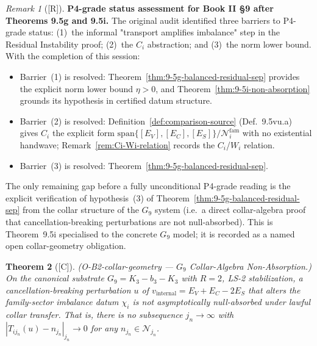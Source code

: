 \documentclass[12pt,oneside]{amsbook}
\theoremstyle{plain}
\newtheorem{theorem}{Theorem}[section]
\theoremstyle{definition}
\theoremstyle{remark}
\newtheorem{remark}[theorem]{Remark}
\newcommand{\status}[1]{\textup{[#1]}}
\begin{document}
\begin{remark}[\status{R}]\label{rem:P4-grade-status}
\textbf{P4-grade status assessment for Book II §9 after Theorems
9.5g and 9.5i.}
The original audit identified three barriers to P4-grade status:
(1)~the informal "transport amplifies imbalance" step in the
Residual Instability proof; (2)~the $C_i$ abstraction; and (3)~the
norm lower bound.
With the completion of this session:
\begin{itemize}
  \item Barrier~(1) is resolved:
    Theorem~\ref{thm:9-5g-balanced-residual-sep} provides the explicit
    norm lower bound $\eta > 0$, and
    Theorem~\ref{thm:9-5i-non-absorption} grounds its hypothesis in
    certified datum structure.
  \item Barrier~(2) is resolved:
    Definition~\ref{def:comparison-source} (Def.~9.5vu.a) gives $C_i$
    the explicit form
    $\mathrm{span}\{[E_V],[E_C],[E_S]\}/\mathcal{N}_i^{\mathrm{fam}}$
    with no existential handwave; Remark~\ref{rem:Ci-Wi-relation}
    records the $C_i$/$W_i$ relation.
  \item Barrier~(3) is resolved: Theorem~\ref{thm:9-5g-balanced-residual-sep}.
\end{itemize}
The only remaining gap before a fully unconditional P4-grade reading
is the explicit verification of hypothesis~(3) of
Theorem~\ref{thm:9-5g-balanced-residual-sep} from the collar
structure of the $G_9$ system (i.e.\ a direct collar-algebra proof
that cancellation-breaking perturbations are not null-absorbed).  This
is Theorem~9.5i specialised to the concrete $G_9$ model; it is
recorded as a named open collar-geometry obligation.
\end{remark}



\begin{theorem}[\status{C}]\label{thm:G9-non-absorption}
\textup{(O-B2-collar-geometry --- $G_9$ Collar-Algebra Non-Absorption.)}
On the canonical substrate $G_9 = K_3 - b_3 - K_3$ with $R=2$, LS-2
stabilization, a cancellation-breaking perturbation $u$ of
$v_{\mathrm{internal}} = E_V + E_C - 2E_S$ that alters the
family-sector imbalance datum $\chi_i$ is not asymptotically null-absorbed
under lawful collar transfer.  That is, there is no subsequence
$j_n \to \infty$ with $|T_{ij_n}(u) - n_{j_n}|_{j_n} \to 0$ for
any $n_{j_n} \in \mathcal{N}_{j_n}$.
\end{theorem}
\end{document}
